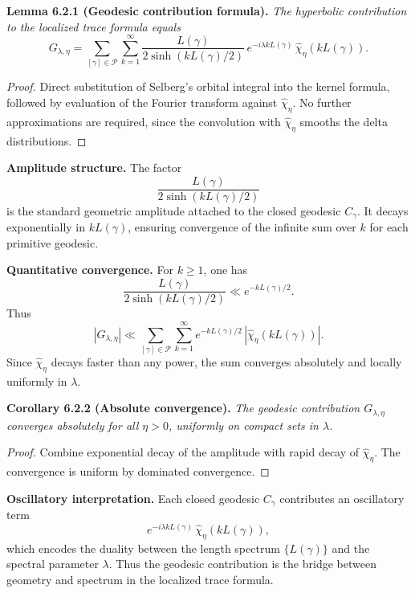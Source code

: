 \medskip

\noindent\textbf{Lemma 6.2.1 (Geodesic contribution formula).}
\emph{The hyperbolic contribution to the localized trace formula equals}
\[
  G_{\lambda,\eta}
  = \sum_{[\gamma]\in\mathcal{P}} \sum_{k=1}^\infty
  \frac{L(\gamma)}{2\sinh(kL(\gamma)/2)}\,
  e^{-i\lambda kL(\gamma)}\,
  \widehat{\chi}_\eta(kL(\gamma)).
\]

\begin{proof}
Direct substitution of Selberg’s orbital integral into the kernel formula, followed by evaluation of the Fourier transform against $\widehat{\chi}_\eta$.  
No further approximations are required, since the convolution with $\widehat{\chi}_\eta$ smooths the delta distributions.
\end{proof}

\medskip

\noindent\textbf{Amplitude structure.}
The factor
\[
  \frac{L(\gamma)}{2\sinh(kL(\gamma)/2)}
\]
is the standard geometric amplitude attached to the closed geodesic $C_\gamma$.  
It decays exponentially in $kL(\gamma)$,  
ensuring convergence of the infinite sum over $k$ for each primitive geodesic.

\medskip

\noindent\textbf{Quantitative convergence.}
For $k\ge 1$, one has
\[
  \frac{L(\gamma)}{2\sinh(kL(\gamma)/2)} \ll e^{-kL(\gamma)/2}.
\]
Thus
\[
  |G_{\lambda,\eta}| \ll \sum_{[\gamma]\in \mathcal{P}} \sum_{k=1}^\infty
  e^{-kL(\gamma)/2}\, |\widehat{\chi}_\eta(kL(\gamma))|.
\]
Since $\widehat{\chi}_\eta$ decays faster than any power, the sum converges absolutely and locally uniformly in $\lambda$.

\medskip

\noindent\textbf{Corollary 6.2.2 (Absolute convergence).}
\emph{The geodesic contribution $G_{\lambda,\eta}$ converges absolutely for all $\eta>0$, uniformly on compact sets in $\lambda$.}

\begin{proof}
Combine exponential decay of the amplitude with rapid decay of $\widehat{\chi}_\eta$.  
The convergence is uniform by dominated convergence.
\end{proof}

\medskip

\noindent\textbf{Oscillatory interpretation.}
Each closed geodesic $C_\gamma$ contributes an oscillatory term
\[
  e^{-i\lambda kL(\gamma)}\, \widehat{\chi}_\eta(kL(\gamma)),
\]
which encodes the duality between the length spectrum $\{L(\gamma)\}$ and the spectral parameter $\lambda$.  
Thus the geodesic contribution is the bridge between geometry and spectrum in the localized trace formula.

